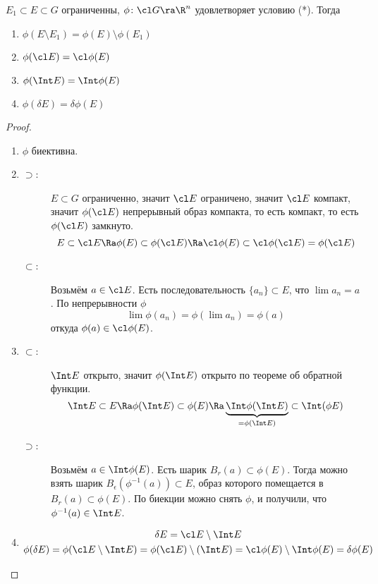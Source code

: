 \begin{lemma}
	$E_1 \subset E \subset G$ ограниченны, $\phi\colon \cl G \ra \R^n$ удовлетворяет условию (*).
	Тогда
	\begin{enumerate}
		\item $\phi(E \setminus E_1) = \phi(E) \setminus \phi(E_1)$
		\item $\phi(\cl E) = \cl \phi(E)$
		\item $\phi(\Int E) = \Int \phi(E)$
		\item $\phi(\delta E) = \delta \phi(E)$
	\end{enumerate}
\end{lemma}
\begin{proof}\begin{enumerate}
\item
	$\phi$ биективна.

\item
	\begin{description}
	\item[$\supset$:]
		$E \subset G$ ограниченно, значит $\cl E$ ограничено, значит $\cl E$ компакт,
		значит $\phi(\cl E)$ непрерывный образ компакта, то есть компакт, то есть $\phi(\cl E)$ замкнуто.
		\[
			E \subset \cl E \Ra \phi(E) \subset \phi(\cl E) \Ra \cl \phi(E) \subset \cl \phi(\cl E) = \phi(\cl E)
		\]

	\item[$\subset$:]
		Возьмём $a \in \cl E$. Есть последовательность $\{a_n\} \subset E$, что $\lim a_n = a$.
		По непрерывности $\phi$
		\[
			\lim \phi(a_n) = \phi(\lim a_n) = \phi(a)
		\]
		откуда $\phi(a) \in \cl \phi(E)$.
	\end{description}

\item
	\begin{description}
	\item[$\subset$:]
		$\Int E$ открыто, значит $\phi(\Int E)$ открыто по теореме об обратной функции.
		\[
			\Int E \subset E \Ra \phi(\Int E) \subset \phi(E) \Ra \underbrace{\Int \phi(\Int E)}_{= \phi(\Int E)} \subset \Int(\phi E)
		\]

	\item[$\supset$:]
		Возьмём $a \in \Int \phi(E)$. Есть шарик $B_r(a) \subset \phi(E)$.
		Тогда можно взять шарик $B_\epsilon(\phi^{-1}(a)) \subset E$, образ которого помещается в $B_r(a) \subset \phi(E)$.
		По биекции можно снять $\phi$, и получили, что $\phi^{-1}(a) \in \Int E$.
	\end{description}

\item
	\begin{gather*}
		\delta E = \cl E \setminus \Int E \\
		\phi(\delta E) = \phi(\cl E \setminus \Int E) = \phi(\cl E) \setminus (\Int E)
		= \cl \phi(E) \setminus \Int \phi(E) = \delta \phi(E)
	\end{gather*}
\end{enumerate}\end{proof}

